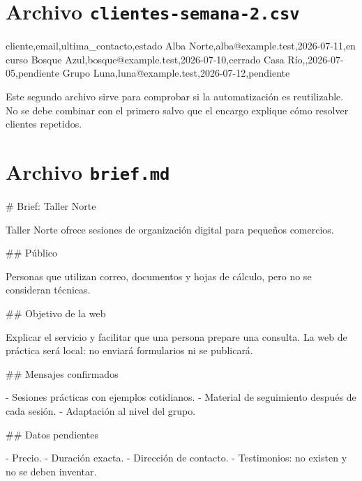 \documentclass[10pt,a4paper,openany]{book}
\newenvironment{Shaded}{}{}
\newcommand{\FunctionTok}[1]{\textcolor[rgb]{0.02,0.16,0.49}{#1}}
\newcommand{\NormalTok}[1]{#1}
\newcommand{\SpecialStringTok}[1]{\textcolor[rgb]{0.73,0.40,0.53}{#1}}
\renewenvironment{Shaded}
  {\begin{tcolorbox}[
    enhanced,
    breakable,
    colback=CodeBg,
    colframe=Border,
    boxrule=0.5pt,
    arc=2mm,
    left=3mm,
    right=3mm,
    top=2.2mm,
    bottom=2.2mm,
    before skip=0.8em,
    after skip=0.9em
  ]}
  {\end{tcolorbox}}
\begin{document}
\section{\texorpdfstring{Archivo
\texttt{clientes-semana-2.csv}}{Archivo clientes-semana-2.csv}}\label{archivo-clientes-semana-2.csv}

\begin{Shaded}
\begin{Highlighting}[]
\NormalTok{cliente,email,ultima\_contacto,estado}
\NormalTok{Alba Norte,alba@example.test,2026{-}07{-}11,en curso}
\NormalTok{Bosque Azul,bosque@example.test,2026{-}07{-}10,cerrado}
\NormalTok{Casa Río,,2026{-}07{-}05,pendiente}
\NormalTok{Grupo Luna,luna@example.test,2026{-}07{-}12,pendiente}
\end{Highlighting}
\end{Shaded}

Este segundo archivo sirve para comprobar si la automatización es
reutilizable. No se debe combinar con el primero salvo que el encargo
explique cómo resolver clientes repetidos.

\section{\texorpdfstring{Archivo
\texttt{brief.md}}{Archivo brief.md}}\label{archivo-brief.md}

\begin{Shaded}
\begin{Highlighting}[]
\FunctionTok{\# Brief: Taller Norte}

\NormalTok{Taller Norte ofrece sesiones de organización digital para pequeños comercios.}

\FunctionTok{\#\# Público}

\NormalTok{Personas que utilizan correo, documentos y hojas de cálculo, pero no se}
\NormalTok{consideran técnicas.}

\FunctionTok{\#\# Objetivo de la web}

\NormalTok{Explicar el servicio y facilitar que una persona prepare una consulta.}
\NormalTok{La web de práctica será local: no enviará formularios ni se publicará.}

\FunctionTok{\#\# Mensajes confirmados}

\SpecialStringTok{{-} }\NormalTok{Sesiones prácticas con ejemplos cotidianos.}
\SpecialStringTok{{-} }\NormalTok{Material de seguimiento después de cada sesión.}
\SpecialStringTok{{-} }\NormalTok{Adaptación al nivel del grupo.}

\FunctionTok{\#\# Datos pendientes}

\SpecialStringTok{{-} }\NormalTok{Precio.}
\SpecialStringTok{{-} }\NormalTok{Duración exacta.}
\SpecialStringTok{{-} }\NormalTok{Dirección de contacto.}
\SpecialStringTok{{-} }\NormalTok{Testimonios: no existen y no se deben inventar.}
\end{Highlighting}
\end{Shaded}
\end{document}

